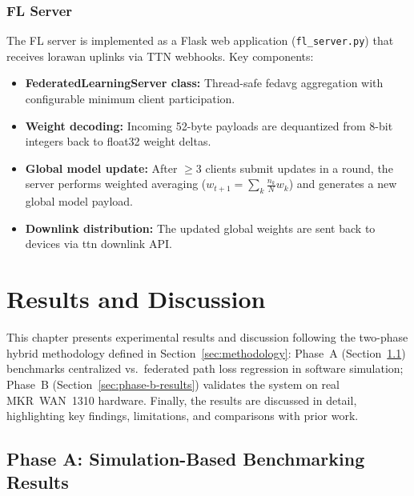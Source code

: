 \documentclass[12pt, a4paper, twoside, openright]{report}
\begin{document}
\subsection{FL Server}
\label{sec:fl-server}
The FL server is implemented as a Flask web application (\texttt{fl\_server.py}) that receives \gls{lorawan} uplinks via TTN webhooks. Key components:
\begin{itemize}
  \item \textbf{FederatedLearningServer class:} Thread-safe \gls{fedavg} aggregation with configurable minimum client participation.
  \item \textbf{Weight decoding:} Incoming 52-byte payloads are dequantized from 8-bit integers back to float32 weight deltas.
  \item \textbf{Global model update:} After $\geq$3 clients submit updates in a round, the server performs weighted averaging ($w_{t+1} = \sum_k \frac{n_k}{N} w_k$) and generates a new global model payload.
  \item \textbf{Downlink distribution:} The updated global weights are sent back to devices via \gls{ttn} downlink API.
\end{itemize}


\chapter{Results and Discussion}
\label{ch:results-discussion}

This chapter presents experimental results and discussion following the two-phase hybrid
methodology defined in Section~\ref{sec:methodology}: Phase~A
(Section~\ref{sec:phase-a-results}) benchmarks centralized vs.\ federated path
loss regression in software simulation; Phase~B
(Section~\ref{sec:phase-b-results}) validates the system on real
MKR~WAN~1310 hardware. Finally, the results are discussed in detail, highlighting
key findings, limitations, and comparisons with prior work.

\section{Phase A: Simulation-Based Benchmarking Results}
\label{sec:phase-a-results}
\end{document}
